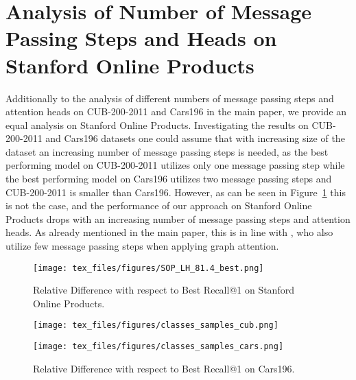 \documentclass{article}
\begin{document}
\section{Analysis of Number of Message Passing Steps and Heads on Stanford Online Products}
\label{sec:LH_SOP}
Additionally to the analysis of different numbers of message passing steps and attention heads on CUB-200-2011 and Cars196 in the main paper, we provide an equal analysis on Stanford Online Products. Investigating the results on CUB-200-2011 and Cars196 datasets one could assume that with increasing size of the dataset an increasing number of message passing steps is needed, as the best performing model on CUB-200-2011 utilizes only one message passing step while the best performing model on Cars196 utilizes two message passing steps and CUB-200-2011 is smaller than Cars196. However, as can be seen in Figure~\ref{fig:sop_LH} this is not the case, and the performance of our approach on Stanford Online Products drops with an increasing number of message passing steps and attention heads. As already mentioned in the main paper, this is in line with \cite{DBLP:conf/iclr/VelickovicCCRLB18}, who also utilize few message passing steps when applying graph attention. 

\begin{figure}
  \begin{center}
  \centerline{\texttt{[image: tex\_files/figures/SOP\_LH\_81.4\_best.png]}}
\caption{Relative Difference with respect to Best Recall@1 on Stanford Online Products.} \label{fig:sop_LH}
  \end{center}
  \vspace{-0.3cm}
\end{figure}

\begin{figure*}[ht!]
\centering
\begin{minipage}{.48\textwidth}
  \begin{center}
  \centerline{\texttt{[image: tex\_files/figures/classes\_samples\_cub.png]}}
  \caption{Relative Difference with respect to Best Recall@1 on CUB-200-2011.} \label{fig:cub_CS}
  \end{center}
\end{minipage}\hfill
\begin{minipage}{.48\textwidth}
  \begin{center}
  \centerline{\texttt{[image: tex\_files/figures/classes\_samples\_cars.png]}}
  \caption{Relative Difference with respect to Best Recall@1 on Cars196.} \label{fig:cars_CS}
  \end{center}
\end{minipage}\end{figure*}
\end{document}
